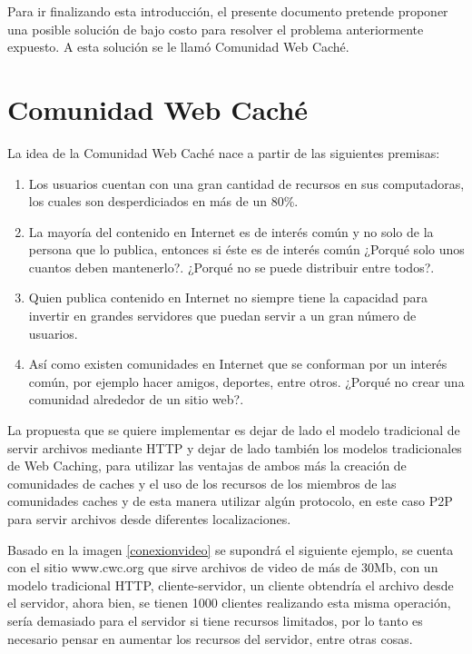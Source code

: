 Para ir finalizando esta introducción, el presente documento pretende proponer una posible solución de bajo costo para resolver el problema anteriormente expuesto. A esta solución se le llamó Comunidad Web Caché. 


\section{Comunidad Web Caché}

La idea de la Comunidad Web Caché nace a partir de las siguientes premisas:

\begin{enumerate}
\item Los usuarios cuentan con una gran cantidad de recursos en sus computadoras, los cuales son desperdiciados en más de un 80\%.
\item La mayoría del contenido en Internet es de interés común y no solo de la persona que lo publica, entonces si éste es de interés común ¿Porqué solo unos cuantos deben mantenerlo?. ¿Porqué no se puede distribuir entre todos?.
\item Quien publica contenido en Internet no siempre tiene la capacidad para invertir en grandes servidores que puedan servir a un gran número de usuarios.
\item Así como existen comunidades en Internet que se conforman por un interés común, por ejemplo hacer amigos, deportes, entre otros. ¿Porqué no crear una comunidad alrededor de un sitio web?.
\end{enumerate}

La propuesta que se quiere implementar es dejar de lado el modelo tradicional de servir archivos mediante HTTP y dejar de lado también los modelos tradicionales de Web Caching, para utilizar las ventajas de ambos más la creación de comunidades de caches y el uso de los recursos de los miembros de las comunidades caches y de esta manera utilizar algún protocolo, en este caso P2P para servir archivos desde diferentes localizaciones.

Basado en la imagen \ref{conexionvideo}  se supondrá el siguiente ejemplo, se cuenta con el sitio www.cwc.org que sirve archivos de video de más de 30Mb, con un modelo tradicional HTTP, cliente-servidor, un cliente obtendría el archivo desde el servidor, ahora bien, se tienen 1000 clientes realizando esta misma operación, sería demasiado para el servidor si tiene recursos limitados, por lo tanto es necesario pensar en aumentar los recursos del servidor, entre otras cosas. 


